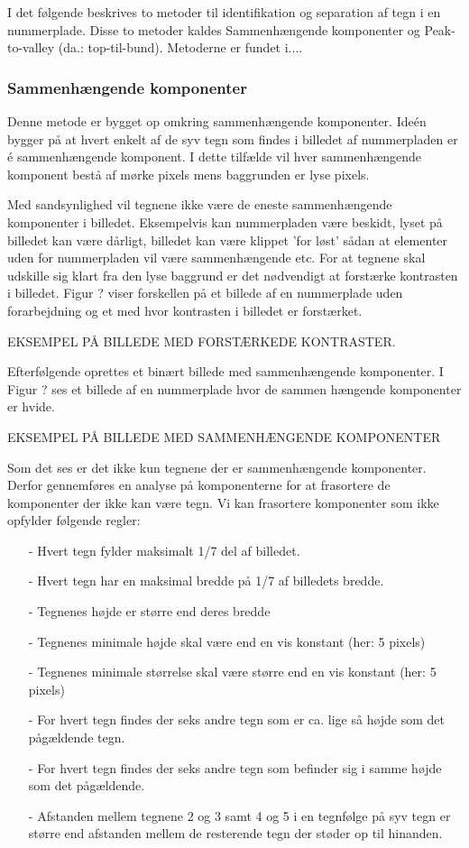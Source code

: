 I det følgende beskrives to metoder til identifikation og separation af tegn i en nummerplade. Disse to metoder kaldes Sammenhængende komponenter og Peak-to-valley (da.: top-til-bund). Metoderne er fundet i....



\subsubsection*{Sammenhængende komponenter}
Denne metode er bygget op omkring sammenhængende komponenter. Ideén bygger på at hvert enkelt af de syv tegn som findes i billedet af nummerpladen er é sammenhængende komponent. I dette tilfælde vil hver sammenhængende komponent bestå af mørke pixels mens baggrunden er lyse pixels.

Med sandsynlighed vil tegnene ikke være de eneste sammenhængende komponenter i billedet. Eksempelvis kan nummerpladen være beskidt, lyset på billedet kan være dårligt, billedet kan være klippet 'for løst' sådan at elementer uden for nummerpladen vil være sammenhængende etc. For at tegnene skal udskille sig klart fra den lyse baggrund er det nødvendigt at forstærke kontrasten i billedet. Figur ? viser forskellen på et billede af en nummerplade uden forarbejdning og et med hvor kontrasten i billedet er forstærket.

EKSEMPEL PÅ BILLEDE MED FORSTÆRKEDE KONTRASTER.

Efterfølgende oprettes et binært billede med sammenhængende komponenter. I Figur ? ses et billede af en nummerplade hvor de sammen hængende komponenter er hvide.

EKSEMPEL PÅ BILLEDE MED SAMMENHÆNGENDE KOMPONENTER

Som det ses er det ikke kun tegnene der er sammenhængende komponenter. Derfor gennemføres en analyse på komponenterne for at frasortere de komponenter der ikke kan være tegn. Vi kan frasortere komponenter som ikke opfylder følgende regler:

\begin{itemize}
\item[-] Hvert tegn fylder maksimalt 1/7 del af billedet.
\item[-] Hvert tegn har en maksimal bredde på 1/7 af billedets bredde.
\item[-] Tegnenes højde er større end deres bredde
\item[-] Tegnenes minimale højde skal være end en vis konstant (her: 5 pixels)
\item[-] Tegnenes minimale størrelse skal være større end en vis konstant (her: 5 pixels)
\item[-] For hvert tegn findes der seks andre tegn som er ca. lige så højde som det pågældende tegn.
\item[-] For hvert tegn findes der seks andre tegn som befinder sig i samme højde som det pågældende.
\item[-] Afstanden mellem tegnene 2 og 3 samt 4 og 5 i en tegnfølge på syv tegn er større end afstanden mellem de resterende tegn der støder op til hinanden.
\end{itemize}

